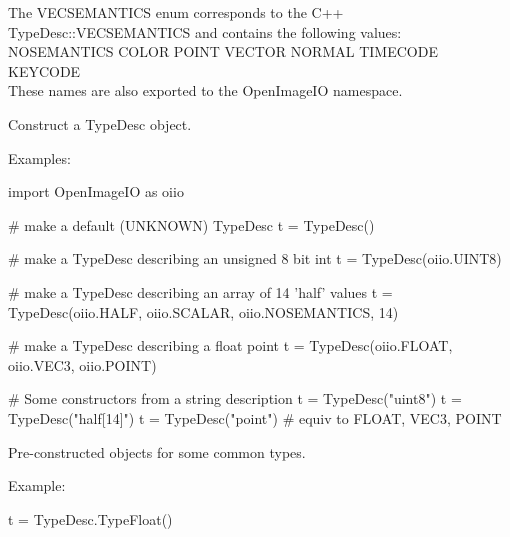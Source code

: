 The {\cf VECSEMANTICS} enum corresponds to the C++ {\cf TypeDesc::VECSEMANTICS} and
contains the following values: \\
{\cf NOSEMANTICS COLOR POINT VECTOR NORMAL TIMECODE KEYCODE} \\
These names are also exported to the {\cf OpenImageIO} namespace.
\apiend


Construct a {\cf TypeDesc} object.  

\noindent Examples:
\begin{code}
    import OpenImageIO as oiio

    # make a default (UNKNOWN) TypeDesc
    t = TypeDesc()

    # make a TypeDesc describing an unsigned 8 bit int
    t = TypeDesc(oiio.UINT8)

    # make a TypeDesc describing an array of 14 'half' values
    t = TypeDesc(oiio.HALF, oiio.SCALAR, oiio.NOSEMANTICS, 14)

    # make a TypeDesc describing a float point
    t = TypeDesc(oiio.FLOAT, oiio.VEC3, oiio.POINT)

    # Some constructors from a string description
    t = TypeDesc("uint8")
    t = TypeDesc("half[14]")
    t = TypeDesc("point")     # equiv to FLOAT, VEC3, POINT
\end{code}
\apiend

Pre-constructed \TypeDesc objects for some common types.

\noindent Example:
\begin{code}
    t = TypeDesc.TypeFloat()
\end{code}
\apiend

